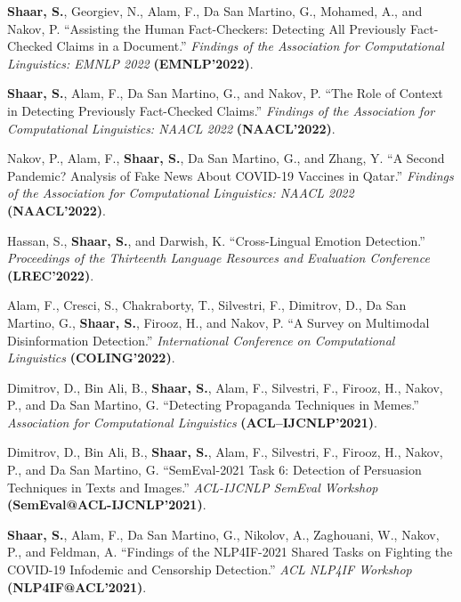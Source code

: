 \begin{publist}
  \item \textbf{Shaar, S.}, Georgiev, N., Alam, F., Da San Martino, G., Mohamed, A., and Nakov, P. ``Assisting the Human Fact-Checkers: Detecting All Previously Fact-Checked Claims in a Document.'' \textit{Findings of the Association for Computational Linguistics: EMNLP 2022} \textbf{(EMNLP'2022)}.

  \item \textbf{Shaar, S.}, Alam, F., Da San Martino, G., and Nakov, P. ``The Role of Context in Detecting Previously Fact-Checked Claims.'' \textit{Findings of the Association for Computational Linguistics: NAACL 2022} \textbf{(NAACL'2022)}.

  \item Nakov, P., Alam, F., \textbf{Shaar, S.}, Da San Martino, G., and Zhang, Y. ``A Second Pandemic? Analysis of Fake News About COVID-19 Vaccines in Qatar.'' \textit{Findings of the Association for Computational Linguistics: NAACL 2022} \textbf{(NAACL'2022)}.

  \item Hassan, S., \textbf{Shaar, S.}, and Darwish, K. ``Cross-Lingual Emotion Detection.'' \textit{Proceedings of the Thirteenth Language Resources and Evaluation Conference} \textbf{(LREC'2022)}.

  \item Alam, F., Cresci, S., Chakraborty, T., Silvestri, F., Dimitrov, D., Da San Martino, G., \textbf{Shaar, S.}, Firooz, H., and Nakov, P. ``A Survey on Multimodal Disinformation Detection.'' \textit{International Conference on Computational Linguistics} \textbf{(COLING'2022)}.

  \item Dimitrov, D., Bin Ali, B., \textbf{Shaar, S.}, Alam, F., Silvestri, F., Firooz, H., Nakov, P., and Da San Martino, G. ``Detecting Propaganda Techniques in Memes.'' \textit{Association for Computational Linguistics} \textbf{(ACL--IJCNLP'2021)}.

  \item Dimitrov, D., Bin Ali, B., \textbf{Shaar, S.}, Alam, F., Silvestri, F., Firooz, H., Nakov, P., and Da San Martino, G. ``SemEval-2021 Task 6: Detection of Persuasion Techniques in Texts and Images.'' \textit{ACL-IJCNLP SemEval Workshop} \textbf{(SemEval@ACL-IJCNLP'2021)}.

  \item \textbf{Shaar, S.}, Alam, F., Da San Martino, G., Nikolov, A., Zaghouani, W., Nakov, P., and Feldman, A. ``Findings of the NLP4IF-2021 Shared Tasks on Fighting the COVID-19 Infodemic and Censorship Detection.'' \textit{ACL NLP4IF Workshop} \textbf{(NLP4IF@ACL'2021)}.


\end{publist}
